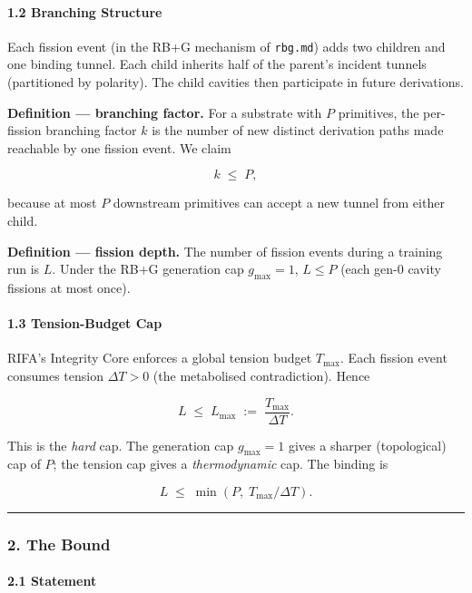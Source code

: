 \documentclass[
  11pt,
  a4paper,
]{article}
\begin{document}
\paragraph{1.2 Branching Structure}\label{branching-structure}

Each fission event (in the RB+G mechanism of \texttt{rbg.md}) adds two
children and one binding tunnel. Each child inherits half of the
parent's incident tunnels (partitioned by polarity). The child cavities
then participate in future derivations.

\textbf{Definition --- branching factor.} For a substrate with \(P\)
primitives, the per-fission branching factor \(k\) is the number of new
distinct derivation paths made reachable by one fission event. We claim

\[
k \;\leq\; P,
\]

because at most \(P\) downstream primitives can accept a new tunnel from
either child.

\textbf{Definition --- fission depth.} The number of fission events
during a training run is \(L\). Under the RB+G generation cap
\(g_\text{max} = 1\), \(L \leq P\) (each gen-0 cavity fissions at most
once).

\paragraph{1.3 Tension-Budget Cap}\label{tension-budget-cap}

RIFA's Integrity Core enforces a global tension budget \(T_\text{max}\).
Each fission event consumes tension \(\Delta T > 0\) (the metabolised
contradiction). Hence

\[
L \;\leq\; L_\text{max} \;:=\; \frac{T_\text{max}}{\Delta T}.
\]

This is the \emph{hard} cap. The generation cap \(g_\text{max} = 1\)
gives a sharper (topological) cap of \(P\); the tension cap gives a
\emph{thermodynamic} cap. The binding is

\[
L \;\leq\; \min\!\left(P, \; T_\text{max}/\Delta T\right).
\]

\begin{center}\rule{0.5\linewidth}{0.5pt}\end{center}

\subsubsection{2. The Bound}\label{the-bound}

\paragraph{2.1 Statement}\label{statement-2}
\end{document}
